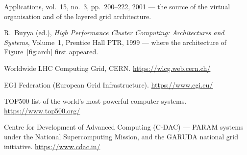 \documentclass[../main.tex]{subfiles}
\begin{document}
\begin{enumerate}[label={[\arabic*]},ref=\arabic*,leftmargin=2.2em]
{        Applications}, vol.~15, no.~3, pp.~200--222, 2001 --- the source of
        the virtual organisation and of the layered grid architecture.
  \item\label{ref:hpcc} R.~Buyya (ed.), \textit{High Performance Cluster
        Computing: Architectures and Systems}, Volume~1, Prentice Hall PTR,
        1999 --- where the architecture of Figure~\ref{fig:arch} first
        appeared.
  \item\label{ref:wlcg} Worldwide LHC Computing Grid, CERN.
        \url{https://wlcg.web.cern.ch/}
  \item\label{ref:egi} EGI Federation (European Grid Infrastructure).
        \url{https://www.egi.eu/}
  \item\label{ref:top500} TOP500 list of the world's most powerful computer
        systems. \url{https://www.top500.org/}
  \item\label{ref:cdac} Centre for Development of Advanced Computing (C-DAC)
        --- PARAM systems under the National Supercomputing Mission, and the
        GARUDA national grid initiative. \url{https://www.cdac.in/}
\end{enumerate}
\end{document}
